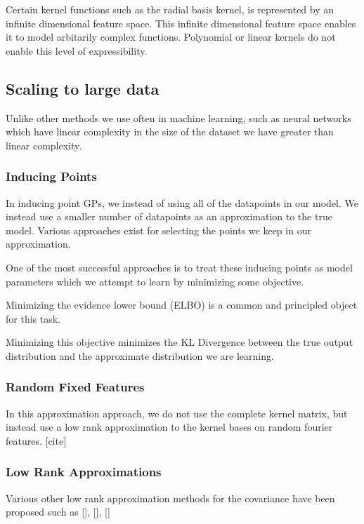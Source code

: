 \documentclass[12pt, a4paper]{report}
\theoremstyle{definition}
\theoremstyle{definition}
\theoremstyle{definition}
\begin{document}
Certain kernel functions such as the radial basis kernel, is represented by an infinite dimensional feature space. This infinite dimensional feature space enables it to model arbitarily complex functions. Polynomial or linear kernels do not enable this level of expressibility.



\subsection{Scaling to large data}

Unlike other methods we use often in machine learning, such as neural networks which have linear complexity in the size of the dataset we have greater than linear complexity.

\subsubsection{Inducing Points}

In inducing point GPs, we instead of using all of the datapoints in our model. We instead use a smaller number of datapoints as an approximation to the true model. Various approaches exist for selecting the points we keep in our approximation.

One of the most successful approaches is to treat these inducing points as model parameters which we attempt to learn by minimizing some objective.

Minimizing the evidence lower bound (ELBO) is a common and principled object for this task.

Minimizing this objective minimizes the KL Divergence between the true output distribution and the approximate distribution we are learning.

\subsubsection{Random Fixed Features}

In this approximation approach, we do not use the complete kernel matrix, but instead use a low rank approximation to the kernel bases on random fourier features. [cite]


\subsubsection{Low Rank Approximations}

Various other low rank approximation methods for the covariance have been proposed such as [], [], []
\end{document}
